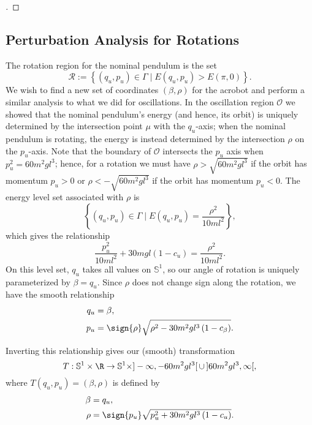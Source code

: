 \begin{proof}[\unskip\nopunct]
\end{proof}

\subsection*{Perturbation Analysis for Rotations}
The rotation region for the nominal pendulum is the set
\[
    \mathcal{R} := \left\{ (q_u,p_u) \in \Gamma \mid E(q_u,p_u) > E(\pi,0)\right\}
    .
\]
We wish to find a new set of coordinates \((\beta,\rho)\) for the acrobot
and perform a similar analysis to what we did for oscillations.
In the oscillation region \(\mathcal{O}\) we showed that the nominal pendulum's
energy (and hence, its orbit) is uniquely determined by the intersection point
\(\mu\) with the \(q_u\)-axis; 
when the nominal pendulum is rotating, the energy is instead determined by the
intersection \(\rho\) on the \(p_u\)-axis.
Note that the boundary of \(\mathcal{O}\) intersects the \(p_u\) axis when 
\(p_u^2 = 60m^2 g l^3\); 
hence, for a rotation we must have \(\rho > \sqrt{60 m^2 g l^3}\) if the
orbit has momentum \(p_u > 0\) 
or \(\rho < -\sqrt{60 m^2 g l^3}\) if the orbit has momentum \(p_u < 0\).
The energy level set associated with \(\rho\) is
\[
    \left\{(q_u,p_u) \in \Gamma \mid E(q_u,p_u) = \frac{\rho^2}{10ml^2}\right\}
    ,
\]
which gives the relationship
\begin{equation}\label{eqn:rotation-pu2}
    \frac{p_u^2}{10m l^2} + 30mgl(1 - c_u) = \frac{\rho^2}{10 ml^2}
    .
\end{equation}
On this level set, \(q_u\) takes all values on \(\mathbb{S}^1\), so our angle of
rotation is uniquely parameterized by \(\beta = q_u\).
Since \(\rho\) does not change sign along the rotation, we have the smooth
relationship
\begin{align}\label{eqn:rotation-Tinv}
    q_u &= \beta
    , \\
    p_u &= \sign{\rho}\sqrt{\rho^2 - 30 m^2 g l^3\left(1 - c_\beta \right)}
    .
\end{align}

Inverting this relationship gives our (smooth) transformation
\begin{equation*}
    T : \mathbb{S}^1 \times \R \rightarrow 
    \mathbb{S}^1 \times ]-\infty,-60m^2gl^3[\, \cup \, ]60m^2gl^3,\infty[ 
    ,
\end{equation*}
where \(T(q_u,p_u) = (\beta,\rho)\) is defined by
\begin{align}\label{eqn:rotation-T}
    \beta &= q_u
    , \\
    \rho &= \sign{p_u}\sqrt{p_u^2 + 30 m^2 g l^3 \left(1 - c_u \right)}
    .
\end{align}


